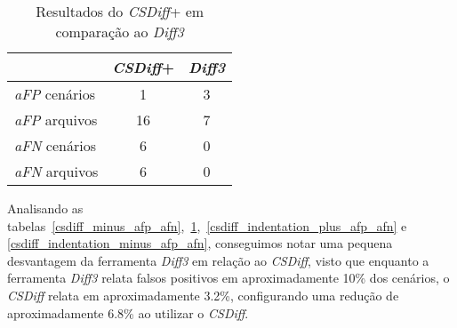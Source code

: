 \begin{table}[ht]
	\begin{center}
		\begin{tabular}{|l|c|c|}
			\hline
			\textbf{ }   & \textbf{\emph{CSDiff}+} & \textbf{\emph{Diff3}} \\
			\hline
			\emph{aFP} cenários & 1                & 3                     \\
			\emph{aFP} arquivos & 16               & 7                     \\
			\emph{aFN} cenários & 6                & 0                     \\
			\emph{aFN} arquivos & 6                & 0                     \\
			\hline
		\end{tabular}
	\end{center}
	\caption{Resultados do \emph{CSDiff}+ em comparação ao \emph{Diff3}}\label{csdiff_plus_afp_afn}
\end{table}
Analisando as tabelas~\ref{csdiff_minus_afp_afn},~\ref{csdiff_plus_afp_afn},~\ref{csdiff_indentation_plus_afp_afn} e
\ref{csdiff_indentation_minus_afp_afn}, conseguimos notar uma pequena desvantagem da ferramenta \emph{Diff3} em relação ao \emph{CSDiff},
visto que enquanto a ferramenta \emph{Diff3} relata falsos positivos em aproximadamente 10\% dos cenários, o
\emph{CSDiff} relata em aproximadamente 3.2\%, configurando uma redução de aproximadamente 6.8\% ao utilizar o \emph{CSDiff}.

